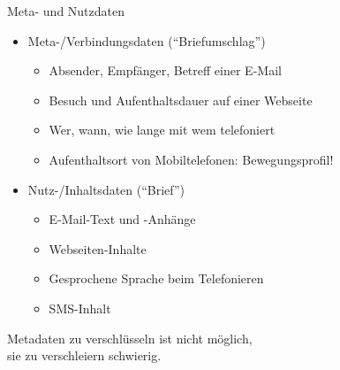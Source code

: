 \begin{frame}{Meta- und Nutzdaten}
  \begin{itemize}
    \item Meta-/Verbindungsdaten (``Briefumschlag'')
    \begin{itemize}
      \item Absender, Empfänger, Betreff einer E-Mail
      \item Besuch und Aufenthaltsdauer auf einer Webseite
      \item Wer, wann, wie lange mit wem telefoniert
      \item Aufenthaltsort von Mobiltelefonen: Bewegungsprofil!
    \end{itemize}
    \item Nutz-/Inhaltsdaten (``Brief'')
    \begin{itemize}
      \item E-Mail-Text und -Anhänge
      \item Webseiten-Inhalte
      \item Gesprochene Sprache beim Telefonieren
      \item SMS-Inhalt
    \end{itemize}
  \end{itemize}

Metadaten zu verschlüsseln ist nicht möglich,\\ sie zu verschleiern schwierig.
\end{frame}


\endinput
